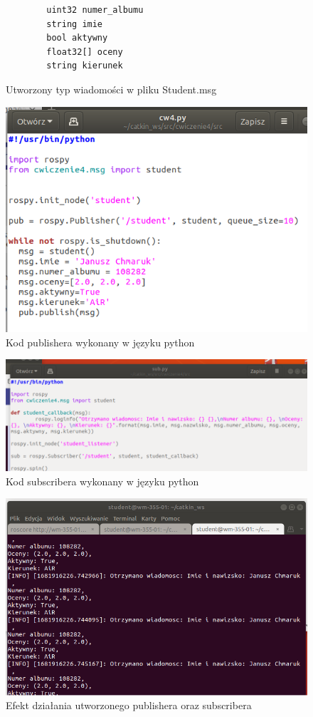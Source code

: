 \documentclass[10pt,a4paper,twoside,twocolumn]{article}%
\begin{document}
\begin{figure}[H]
    \centering
    \begin{verbatim}
        uint32 numer_albumu
        string imie
        bool aktywny
        float32[] oceny
        string kierunek
    \end{verbatim}
    \caption{Utworzony typ wiadomości w pliku Student.msg}
\end{figure}


%
\begin{figure}[H]
    \centering
    \includegraphics[width=0.8\linewidth]{cw4_py.png}
    \caption{Kod publishera wykonany w języku python}
\end{figure}

\begin{figure}[H]
    \centering
    \includegraphics[width=1\linewidth]{sub_py.png}
    \caption{Kod subscribera wykonany w języku python}
\end{figure}

\begin{figure}[H]
    \centering
    \includegraphics[width=1\linewidth]{konsola.png}
    \caption{Efekt działania utworzonego publishera oraz subscribera}
\end{figure}
\end{document}
